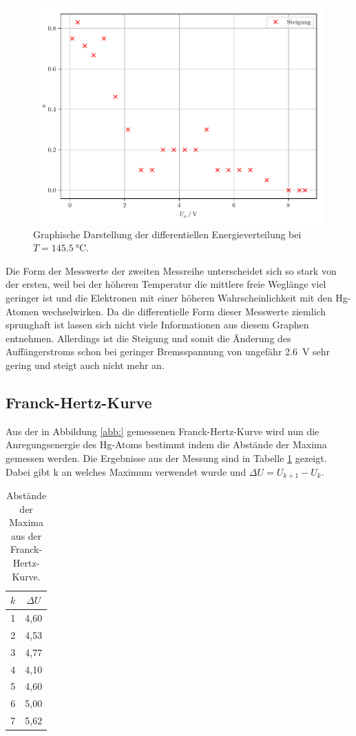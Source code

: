 \begin{figure}[H]
  \includegraphics[width=\textwidth]{plot2.pdf}
  \caption{Graphische Darstellung der differentiellen Energieverteilung bei $T = \SI{145.5}{\celsius}$.}
  \label{abb:4}
\end{figure}

Die Form der Messwerte der zweiten Messreihe unterscheidet sich so stark von der
ersten, weil bei der höheren Temperatur die mittlere freie Weglänge viel geringer ist
und die Elektronen mit einer höheren Wahrscheinlichkeit mit den Hg-Atomen wechselwirken.
Da die differentielle Form dieser Messwerte ziemlich sprunghaft ist lassen sich nicht
viele Informationen aus diesem Graphen entnehmen. Allerdings ist die Steigung und
somit die Änderung des Auffängerstroms schon bei geringer Bremsspannung von ungefähr \SI{2.6}{\volt}
sehr gering und steigt auch nicht mehr an. 

\subsection{Franck-Hertz-Kurve}
Aus der in Abbildung \ref{abb:} gemessenen Franck-Hertz-Kurve wird nun die Anregungsenergie
des Hg-Atoms bestimmt indem die Abstände der Maxima gemessen werden. Die Ergebnisse
aus der Messung sind in Tabelle \ref{tab:4} gezeigt. Dabei gibt k an welches Maximum verwendet
wurde und $\Delta U = U_{k+1}-U_k$.

\begin{table}[H]
  \centering
  \caption{Abstände der Maxima aus der Franck-Hertz-Kurve.}
  \label{tab:4}
  \begin{tabular}{c c}
    \toprule
    $k$ & $\Delta U$ \\
    \midrule
    1 & 4,60 \\
    2 & 4,53 \\
    3 & 4,77 \\
    4 & 4,10 \\
    5 & 4,60 \\
    6 & 5,00 \\
    7 & 5,62 \\
    \bottomrule
  \end{tabular}
\end{table}

